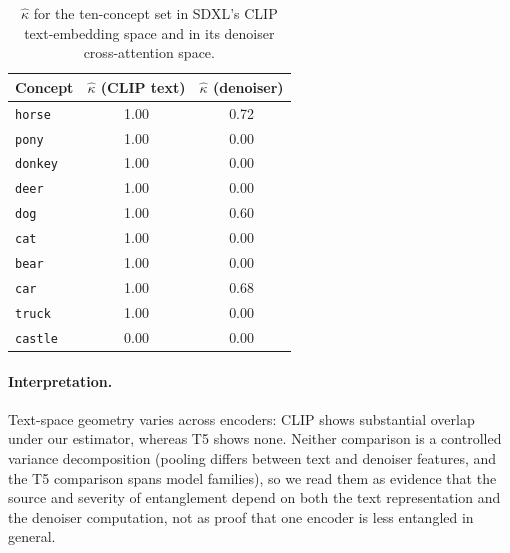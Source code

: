 \begin{table}[h]\centering\small
\caption{$\hat\kappa$ for the ten-concept set in SDXL's CLIP text-embedding
space and in its denoiser cross-attention space.}\label{tab:sdxl-text-vs-denoiser}
\begin{tabular}{lcc}\toprule
Concept & $\hat\kappa$ (CLIP text) & $\hat\kappa$ (denoiser)\\\midrule
\texttt{horse}  & 1.00 & 0.72\\
\texttt{pony}   & 1.00 & 0.00\\
\texttt{donkey} & 1.00 & 0.00\\
\texttt{deer}   & 1.00 & 0.00\\
\texttt{dog}    & 1.00 & 0.60\\
\texttt{cat}    & 1.00 & 0.00\\
\texttt{bear}   & 1.00 & 0.00\\
\texttt{car}    & 1.00 & 0.68\\
\texttt{truck}  & 1.00 & 0.00\\
\texttt{castle} & 0.00 & 0.00\\\bottomrule
\end{tabular}
\end{table}

\paragraph{Interpretation.} Text-space geometry varies across encoders: CLIP
shows substantial overlap under our estimator, whereas T5 shows none. Neither
comparison is a controlled variance decomposition (pooling differs between text
and denoiser features, and the T5 comparison spans model families), so we read
them as evidence that the source and severity of entanglement depend on both
the text representation and the denoiser computation, not as proof that one
encoder is less entangled in general.
